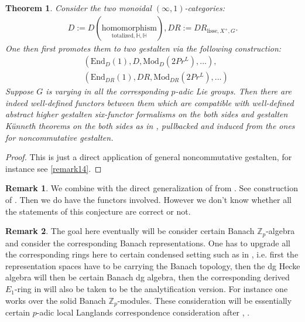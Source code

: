 \documentclass[12pt]{article}
\newtheorem{theorem}{Theorem}
\theoremstyle{definition}
\newtheorem{remark}{Remark}
\begin{document}
\begin{theorem}
Consider the two monoidal $(\infty,1)$-categories:
\begin{align}
D:=D(\underset{{\mathrm{totalized},\mathbb{H},\mathbb{H}}}{\mathrm{homomorphism}}),DR:=DR_{\mathrm{lisse},X^+,G}.
\end{align}
One then first promotes them to two gestalten via the following construction:
\begin{align}
&(\mathrm{End}_D(1),D,\mathrm{Mod}_{D}(2Pr^L),...),\\
&(\mathrm{End}_{DR}(1),DR,\mathrm{Mod}_{DR}(2Pr^L),...)
\end{align}
Suppose $G$ is varying in all the corresponding $p$-adic Lie groups. Then there are indeed well-defined functors between them which are compatible with well-defined abstract higher gestalten six-functor formalisms on the both sides and gestalten K\"unneth theorems on the both sides as in \cite[Theorem 5.2, Corollary 5.3, Corollary 5.4]{5S5}, pullbacked and induced from the ones for noncommutative gestalten.
\end{theorem}

\begin{proof}
This is just a direct application of general noncommutative gestalten, for instance see \cref{remark14}.
\end{proof}

\begin{remark}
We combine \cite[Theorem 1.2]{Sa} with the direct generalization of \cite{Sc1} from \cite{HM}. See construction of \cite[Theorem 9]{Sc1}. Then we do have the functors involved. However we don't know whether all the statements of this conjecture are correct or not.
\end{remark}










\begin{remark}
The goal here eventually will be consider certain Banach $\mathbb{Z}_p$-algebra and consider the corresponding Banach representations. One has to upgrade all the corresponding rings here to certain condensed setting such as in \cite{HM}, i.e. first the representation spaces have to be carrying the Banach topology, then the dg Hecke algebra will then be certain Banach dg algebra, then the corresponding derived $E_1$-ring in \cite{Sa} will also be taken to be the analytification version. For instance one works over the solid Banach $\mathbb{Z}_p$-modules. These consideration will be essentially certain $p$-adic local Langlands correspondence consideration after \cite{L1}, \cite{C}. 
\end{remark}
\end{document}
